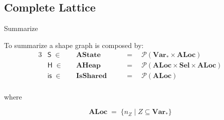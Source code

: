 \documentclass[xcolor=svgnames,11pt]{beamer}
\begin{document}
%

\subsection{Complete Lattice}

\begin{frame}{Summarize}

To summarize a shape graph is composed by:
\begin{alignat*}{3}
& \mathsf{S} \;\in && \; \mathbf{AState} \quad && =\quad \mathcal{P}(\mathbf{Var}_* \times \mathbf{ALoc}) \\
& \mathsf{H} \;\in && \; \mathbf{AHeap} \quad && =\quad \mathcal{P}(\mathbf{ALoc} \times \mathbf{Sel} \times \mathbf{ALoc}) \\
& \mathsf{is} \;\in && \; \mathbf{IsShared} \quad && =\quad \mathcal{P}(\mathbf{ALoc}) \\
\end{alignat*}

where

$$ \mathbf{ALoc} \; = \; \{ n_Z \;|\; Z \subseteq \mathbf{Var}_* \} $$

\end{frame}
\end{document}
